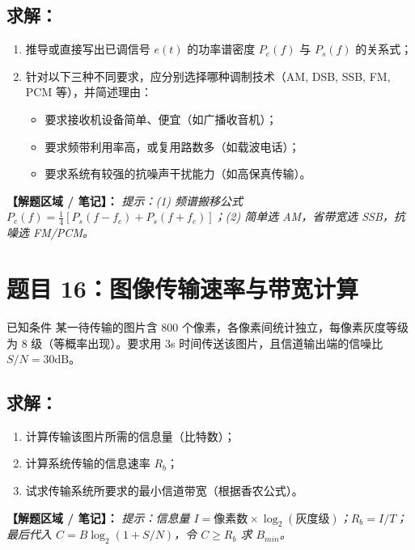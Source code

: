 \documentclass[12pt, a4paper]{article}
\begin{document}
	\subsection*{求解：}
	\begin{enumerate}[label=(\arabic*)]
		\item 推导或直接写出已调信号 $e(t)$ 的功率谱密度 $P_e(f)$ 与 $P_s(f)$ 的关系式；
		\item 针对以下三种不同要求，应分别选择哪种调制技术（AM, DSB, SSB, FM, PCM 等），并简述理由：
		\begin{itemize}
			\item 要求接收机设备简单、便宜（如广播收音机）；
			\item 要求频带利用率高，或复用路数多（如载波电话）；
			\item 要求系统有较强的抗噪声干扰能力（如高保真传输）。
		\end{itemize}
	\end{enumerate}
	
	\noindent\textbf{【解题区域 / 笔记】：}
	\textit{提示：(1) 频谱搬移公式 $P_e(f) = \frac{1}{4}[P_s(f-f_c) + P_s(f+f_c)]$；(2) 简单选 AM，省带宽选 SSB，抗噪选 FM/PCM。}
	
	\newpage
	
	\section*{题目 16：图像传输速率与带宽计算}
	
	\begin{problembox}{已知条件}
		某一待传输的图片含 800 个像素，各像素间统计独立，每像素灰度等级为 8 级（等概率出现）。要求用 3s 时间传送该图片，且信道输出端的信噪比 $S/N = 30\text{dB}$。
	\end{problembox}
	
	\subsection*{求解：}
	\begin{enumerate}[label=(\arabic*)]
		\item 计算传输该图片所需的信息量（比特数）；
		\item 计算系统传输的信息速率 $R_b$；
		\item 试求传输系统所要求的最小信道带宽（根据香农公式）。
	\end{enumerate}
	
	\noindent\textbf{【解题区域 / 笔记】：}
	\textit{提示：信息量 $I = \text{像素数} \times \log_2(\text{灰度级})$；$R_b = I / T$；最后代入 $C = B \log_2(1+S/N)$，令 $C \ge R_b$ 求 $B_{min}$。}
	
\end{document}
